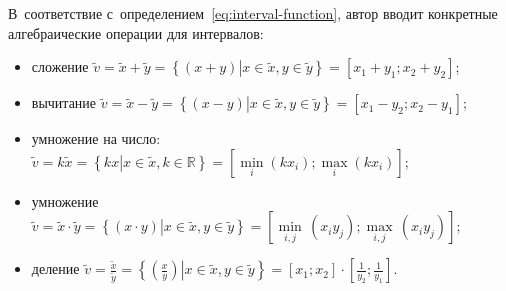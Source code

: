 В~соответствие с~определением~\eqref{eq:interval-function}, автор вводит конкретные алгебраические операции для интервалов:
\begin{itemize}
	\item сложение $\tilde{v}=\tilde{x}+\tilde{y}=\left\{ \left( x+y \right)\left| x\in \tilde{x},y\in \tilde{y} \right. \right\}=\left[ {{x}_{1}}+{{y}_{1}};{{x}_{2}}+{{y}_{2}} \right]$;
	\item вычитание $\tilde{v}=\tilde{x}-\tilde{y}=\left\{ \left( x-y \right)\left| x\in \tilde{x},y\in \tilde{y} \right. \right\}=\left[ {{x}_{1}}-{{y}_{2}};{{x}_{2}}-{{y}_{1}} \right]$;
	\item умножение на число: $\tilde{v}=k\tilde{x}=\left\{ kx\left| x\in \tilde{x},k\in \mathbb{R} \right. \right\}=\left[\underset{i}{\mathop {\min}} \left( kx_i \right); \underset{i}{\mathop {\max}} \left( kx_i \right) \right]$;
	
	\item умножение $\tilde{v}=\tilde{x}\cdot \tilde{y}=\left\{ \left( x\cdot y \right)\left| x\in \tilde{x},y\in \tilde{y} \right. \right\}=\left[ \underset{i,j}{\mathop{\min }}\,\left( {{x}_{i}}{{y}_{j}} \right);\underset{i,j}{\mathop{\max }}\,\left( {{x}_{i}}{{y}_{j}} \right) \right]$;
	\item деление $\displaystyle \tilde{v}=\frac{{\tilde{x}}}{{\tilde{y}}}=\left\{ \left. \left( \frac{x}{y} \right) \right|x\in \tilde{x},y\in \tilde{y} \right\}=\left[ {{x}_{1}};{{x}_{2}} \right]\cdot \left[ \frac{1}{{{y}_{2}}};\frac{1}{{{y}_{1}}} \right]$.
\end{itemize}

